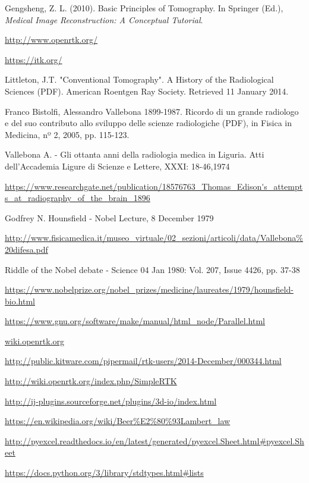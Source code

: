 \documentclass[a4paper,11pt, oneside]{article}
\begin{document}
\newpage
\begin{thebibliography}{1}
        Gengsheng, Z. L. (2010). Basic Principles of Tomography. In Springer (Ed.), \textit{Medical Image Reconstruction: A Conceptual Tutorial}.
        
        \url{http://www.openrtk.org/}
    
        \url{https://itk.org/}
    
        Littleton, J.T. "Conventional Tomography". A History of the Radiological Sciences (PDF). American Roentgen Ray Society. Retrieved 11 January 2014.
    
        Franco Bistolfi, Alessandro Vallebona 1899-1987. Ricordo di un grande radiologo e del suo contributo allo sviluppo delle scienze radiologiche (PDF), in Fisica in Medicina, nº 2, 2005, pp. 115-123.
        
        Vallebona A. - Gli ottanta anni della radiologia medica in Liguria. Atti dell’Accademia Ligure di Scienze e Lettere, XXXI: 18-46,1974
        
        \url{https://www.researchgate.net/publication/18576763_Thomas_Edison's_attempts_at_radiography_of_the_brain_1896}
        
        Godfrey N. Hounsfield - Nobel Lecture, 8 December 1979
        
        \url{http://www.fisicamedica.it/museo_virtuale/02_sezioni/articoli/data/Vallebona%20difesa.pdf}
        
        Riddle of the Nobel debate - Science 04 Jan 1980: Vol. 207, Issue 4426, pp. 37-38
        
        \url{https://www.nobelprize.org/nobel_prizes/medicine/laureates/1979/hounsfield-bio.html}
    
        \url{https://www.gnu.org/software/make/manual/html_node/Parallel.html}
        
        \url{wiki.openrtk.org}
        
        \url{http://public.kitware.com/pipermail/rtk-users/2014-December/000344.html}
        
        \url{http://wiki.openrtk.org/index.php/SimpleRTK}
        
        \url{http://ij-plugins.sourceforge.net/plugins/3d-io/index.html}
    
        \url{https://en.wikipedia.org/wiki/Beer%E2%80%93Lambert_law}
        
        \url{http://pyexcel.readthedocs.io/en/latest/generated/pyexcel.Sheet.html#pyexcel.Sheet}
        
        \url{https://docs.python.org/3/library/stdtypes.html#lists}
    \end{thebibliography}
\end{document}
